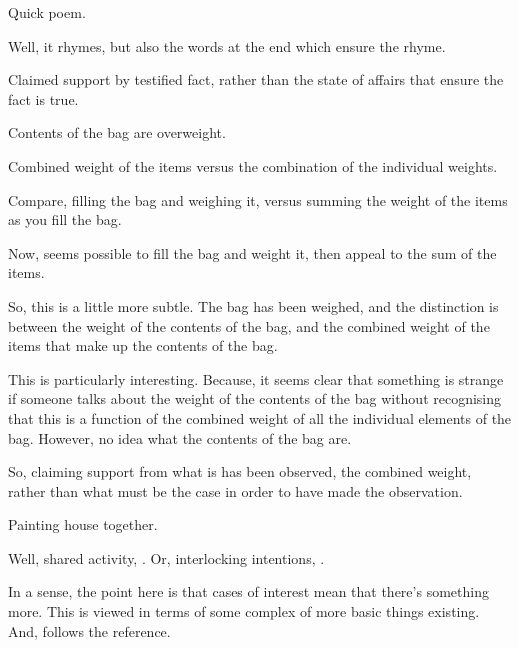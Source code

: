 \begin{note}
  Quick poem.

  Well, it rhymes, but also the words at the end which ensure the rhyme.

  Claimed support by testified fact, rather than the state of affairs that ensure the fact is true.
\end{note}

\begin{note}
  Contents of the bag are overweight.

  Combined weight of the items versus the combination of the individual weights.

  Compare, filling the bag and weighing it, versus summing the weight of the items as you fill the bag.

  Now, seems possible to fill the bag and weight it, then appeal to the sum of the items.

  So, this is a little more subtle.
  The bag has been weighed, and the distinction is between the weight of the contents of the bag, and the combined weight of the items that make up the contents of the bag.

  This is particularly interesting.
  Because, it seems clear that something is strange if someone talks about the weight of the contents of the bag without recognising that this is a function of the combined weight of all the individual elements of the bag.
  However, no idea what the contents of the bag are.

  So, claiming support from what is has been observed, the combined weight, rather than what must be the case in order to have made the observation.
\end{note}

\begin{note}
  Painting house together.

  Well, shared activity, \adS{}.
  Or, interlocking intentions, \adC{}.
\end{note}

\begin{note}[Existentials]
  In a sense, the point here is that \adS{} cases of interest mean that there's something more.
  This is viewed in terms of some complex of more basic things existing.
  And, \adC{} follows the reference.
\end{note}

\subsubsection{\adS{}}
\label{sec:ads}

